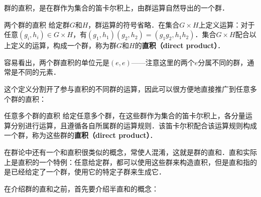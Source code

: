 
群的直积，是在群作为集合的笛卡尔积上，由群运算自然导出的一个群．

\begin{definition}{两个群的直积}
给定群$G$和$H$，群运算的符号省略．在集合$G\times H$上定义运算：对于任意$(g_i, h_i)\in G\times H$，有$(g_1, h_1)(g_2, h_2)=(g_1g_2, h_1h_2)$．集合$G\times H$配合以上定义的运算，构成一个群，称为群$G$和$H$的\textbf{直积（direct product）}．
\end{definition}

容易看出，两个群直积的单位元是$(e, e)$——注意这里的两个$e$分属不同的群，通常是不同的元素．

这个定义分割开了参与直积的不同群的运算，因此可以很方便地直接推广到任意多个群的直积：

\begin{definition}{任意多个群的直积}
给定任意多个群，在这些群作为集合的笛卡尔积上，各分量运算分别进行运算，且遵循各自所属群的运算规则．该笛卡尔积配合该运算规则构成一个群，称为这些群的\textbf{直积（direct product）}．
\end{definition}

在群论中还有一个和直积很类似的概念，常使人混淆，这就是群的直和．直和实际上是直积的一个特例：任意给定群，都可以使用这些群来构造直积，但是直和指的是已经给定了一个群，使用它的特定子群来生成它．

在介绍群的直和之前，首先要介绍半直和的概念：









